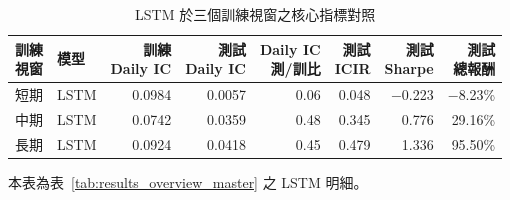 \begin{table}[H]
\centering
\caption{LSTM 於三個訓練視窗之核心指標對照}
\label{tab:results_lstm_detail}
\begingroup
\scriptsize
\setlength{\tabcolsep}{4pt}
\renewcommand{\arraystretch}{1.10}
\begin{adjustbox}{max width=\textwidth}
\begin{tabular}{@{}llrrrrrr@{}}
\toprule
\makecell[l]{訓練\\視窗} & 模型 & \makecell[r]{訓練\\Daily IC} & \makecell[r]{測試\\Daily IC} & \makecell[r]{Daily IC\\測/訓比} & \makecell[r]{測試\\ICIR} & \makecell[r]{測試\\Sharpe} & \makecell[r]{測試\\總報酬} \\
\midrule
短期 & LSTM & 0.0984 & 0.0057 & 0.06 & 0.048 & $-$0.223 & $-$8.23\% \\
中期 & LSTM & 0.0742 & 0.0359 & 0.48 & 0.345 & 0.776 & 29.16\% \\
長期 & LSTM & 0.0924 & 0.0418 & 0.45 & 0.479 & 1.336 & 95.50\% \\
\bottomrule
\end{tabular}
\end{adjustbox}
\smallskip

{\footnotesize 本表為表~\ref{tab:results_overview_master} 之 LSTM 明細。}
\endgroup
\end{table}
